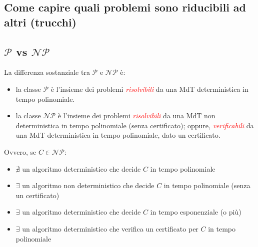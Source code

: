 \documentclass{article}  %
\theoremstyle{definition}
\begin{document}
\break
\subsection{Come capire quali problemi sono riducibili ad altri (trucchi)}
\subsection{$\mathcal{P}$ vs $\mathcal{NP}$}
La differenza sostanziale tra $\mathcal{P}$ e $\mathcal{NP}$ è:
\begin{itemize}
	\item la classe $\mathcal{P}$ è l'insieme dei problemi \textcolor{red}{\textit{risolvibili}} da una MdT deterministica in tempo polinomiale.
	\item la classe $\mathcal{NP}$ è l'insieme dei problemi \textcolor{red}{\textit{risolvibili}} da una MdT non deterministica in tempo polinomiale (senza
	      certificato); oppure,\textcolor{red}{\textit{ verificabili}} da una MdT deterministica in tempo polinomiale, dato un certificato.
\end{itemize}
Ovvero, se $C \in \mathcal{NP}$:
\begin{itemize}
	\item $\nexists$ un algoritmo deterministico che decide $C$ in tempo polinomiale
	\item $\exists$ un algoritmo non deterministico che decide $C$ in tempo polinomiale (senza un certificato)
	\item $\exists$ un algoritmo deterministico che decide $C$ in tempo esponenziale (o più)
	\item $\exists$ un algoritmo deterministico che verifica un certificato per $C$ in tempo polinomiale
\end{itemize}
\end{document}
